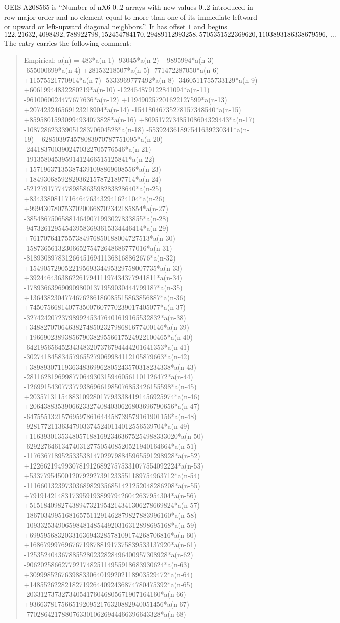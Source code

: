 \documentclass[11pt,a4paper]{article}
\theoremstyle{plain}
\theoremstyle{definition}
\begin{document}
OEIS A208565 is ``Number of nX6 0..2 arrays with new values 0..2 introduced in row major order and no element equal to more than one of its immediate leftward or upward or left-upward diagonal neighbors.''. It has offset $1$ and begins
\[
122, 21632, 4098492, 788922798, 152454784170, 29489112993258, 5705351522369620, 1103893186338679596,\ \dots
\]
The entry carries the following comment:
\begin{quote}\small
Empirical: a(n) = 483*a(n-1) -93045*a(n-2) +9895994*a(n-3) -655000699*a(n-4) +28153218507*a(n-5) -771472287050*a(n-6) +11575521770914*a(n-7) -5333969777492*a(n-8) -3460511755733129*a(n-9) +60619944832280219*a(n-10) -122454879122841094*a(n-11) -9610060024477677636*a(n-12) +119490257201622127599*a(n-13) +207423246569123218904*a(n-14) -15418046735278157348540*a(n-15) +85958015930994934073828*a(n-16) +809517273485108604329443*a(n-17) -10872862333905128370604528*a(n-18) -553924361897541639230341*a(n-19) +628503974578083970787751095*a(n-20) -2441837003902470322705776546*a(n-21) -19135804539591412466515125841*a(n-22) +157196371353874391098869608556*a(n-23) +184930685928293621578721897714*a(n-24) -5212791777478985863598283828640*a(n-25) +8343380811716464763432941624104*a(n-26) +99943078075370200668702342185854*a(n-27) -385486750658814649071993027833855*a(n-28) -947326129545439583693615334446414*a(n-29) +7617076417557384976850188004727513*a(n-30) -1587365613230665275472648686777016*a(n-31) -81893089783126645169411368168862676*a(n-32) +154905729052219569334495329758007735*a(n-33) +392446436386226179411197434377941811*a(n-34) -1789366396909098001371959030444799187*a(n-35) +1364382304774676286186085515863856887*a(n-36) +7450756681407735007607770239017405077*a(n-37) -32742420723798992453476401619165532832*a(n-38) +34882707064638274850232798681677400146*a(n-39) +196690238938567903829556617524922100465*a(n-40) -642195656452343483207376794444201641353*a(n-41) -302741845834579655279069984112105879663*a(n-42) +3898930711936348369962805243570318234338*a(n-43) -2811628196998770649303159460561101126472*a(n-44) -12699154307737793869661985076853426155598*a(n-45) +20357131154883109280177933384191456925974*a(n-46) +20643883539066233274084030626803696790656*a(n-47) -64755513215769597861644458739579161901156*a(n-48) -928177211363479033745240114012556539704*a(n-49) +116393013534805718816923463675254988333020*a(n-50) -62922764613474031277505408520521940164664*a(n-51) -117636718952533538147029798845965591298928*a(n-52) +122662194993078191268927575331077554092224*a(n-53) +53377954500120792927391233551189754963712*a(n-54) -111660132397303689829356851421252048286208*a(n-55) +7919142148317395919389979426042637954304*a(n-56) +51518409827438947321954214341306278669824*a(n-57) -18670349951681657511291462879827883996160*a(n-58) -10933253490659848148544920316312898695168*a(n-59) +6995956832033163694328578109174268706816*a(n-60) +1686799976967671987881917375839533137920*a(n-61) -1253524043678855280232828496400957308928*a(n-62) -906202586627792174825114955918683930624*a(n-63) +309998526763988330640199202118903529472*a(n-64) +148552622821827192644092436874780475392*a(n-65) -20331273732734054176046805671907164160*a(n-66) +93663781756651920952176320882940051456*a(n-67) -77028642178807633010626944466396643328*a(n-68) 
\end{quote}
\end{document}
